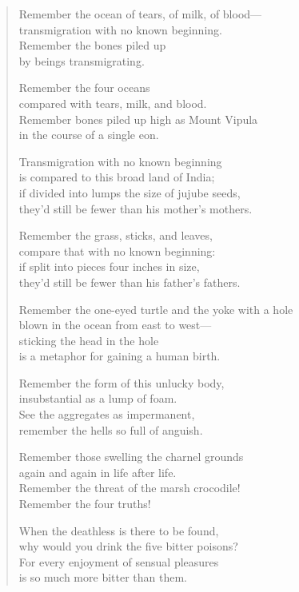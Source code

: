 \documentclass[12pt,openany]{book}%
\begin{document}
\begin{verse}
Remember the ocean of tears, of milk, of blood—\\
transmigration with no known beginning. \\
Remember the bones piled up \\
by beings transmigrating. 

Remember the four oceans \\
compared with tears, milk, and blood. \\
Remember bones piled up high as Mount Vipula \\
in the course of a single eon. 

Transmigration with no known beginning \\
is compared to this broad land of India; \\
if divided into lumps the size of jujube seeds, \\
they’d still be fewer than his mother’s mothers. 

Remember the grass, sticks, and leaves, \\
compare that with no known beginning: \\
if split into pieces four inches in size, \\
they’d still be fewer than his father’s fathers. 

Remember the one-eyed turtle and the yoke with a hole \\
blown in the ocean from east to west—\\
sticking the head in the hole \\
is a metaphor for gaining a human birth. 

Remember the form of this unlucky body, \\
insubstantial as a lump of foam. \\
See the aggregates as impermanent, \\
remember the hells so full of anguish. 

Remember those swelling the charnel grounds \\
again and again in life after life. \\
Remember the threat of the marsh crocodile! \\
Remember the four truths! 

When the deathless is there to be found, \\
why would you drink the five bitter poisons? \\
For every enjoyment of sensual pleasures \\
is so much more bitter than them. 


\end{verse}
\end{document}
